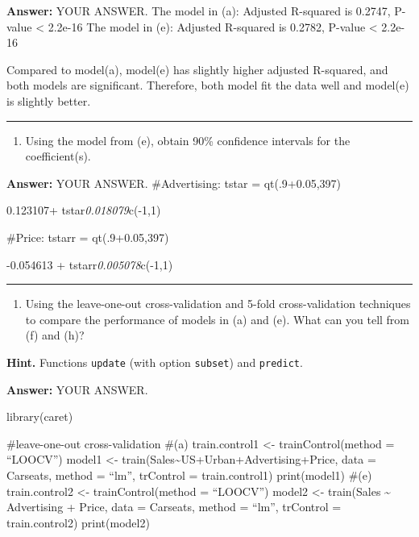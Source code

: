 \documentclass[
]{article}
\providecommand{\tightlist}{%
  \setlength{\itemsep}{0pt}\setlength{\parskip}{0pt}}
\begin{document}
\textbf{Answer:} YOUR ANSWER. The model in (a): Adjusted R-squared is
0.2747, P-value \textless{} 2.2e-16 The model in (e): Adjusted R-squared
is 0.2782, P-value \textless{} 2.2e-16

Compared to model(a), model(e) has slightly higher adjusted R-squared,
and both models are significant. Therefore, both model fit the data well
and model(e) is slightly better.

\begin{center}\rule{0.5\linewidth}{\linethickness}\end{center}

\begin{enumerate}
\def\labelenumi{(\alph{enumi})}
\setcounter{enumi}{6}
\tightlist
\item
  Using the model from (e), obtain 90\% confidence intervals for the
  coefficient(s).
\end{enumerate}

\textbf{Answer:} YOUR ANSWER. \#Advertising: tstar = qt(.9+0.05,397)

0.123107+ tstar\emph{0.018079}c(-1,1)

\#Price: tstarr = qt(.9+0.05,397)

-0.054613 + tstarr\emph{0.005078}c(-1,1)

\begin{center}\rule{0.5\linewidth}{\linethickness}\end{center}

\begin{enumerate}
\def\labelenumi{(\alph{enumi})}
\setcounter{enumi}{7}
\tightlist
\item
  Using the leave-one-out cross-validation and 5-fold cross-validation
  techniques to compare the performance of models in (a) and (e). What
  can you tell from (f) and (h)?
\end{enumerate}

\textbf{Hint.} Functions \texttt{update} (with option \texttt{subset})
and \texttt{predict}.

\textbf{Answer:} YOUR ANSWER.

library(caret)

\#leave-one-out cross-validation \#(a) train.control1 \textless-
trainControl(method = ``LOOCV'') model1 \textless-
train(Sales\textasciitilde US+Urban+Advertising+Price, data = Carseats,
method = ``lm'', trControl = train.control1) print(model1) \#(e)
train.control2 \textless- trainControl(method = ``LOOCV'') model2
\textless- train(Sales \textasciitilde{} Advertising + Price, data =
Carseats, method = ``lm'', trControl = train.control2) print(model2)
\end{document}
